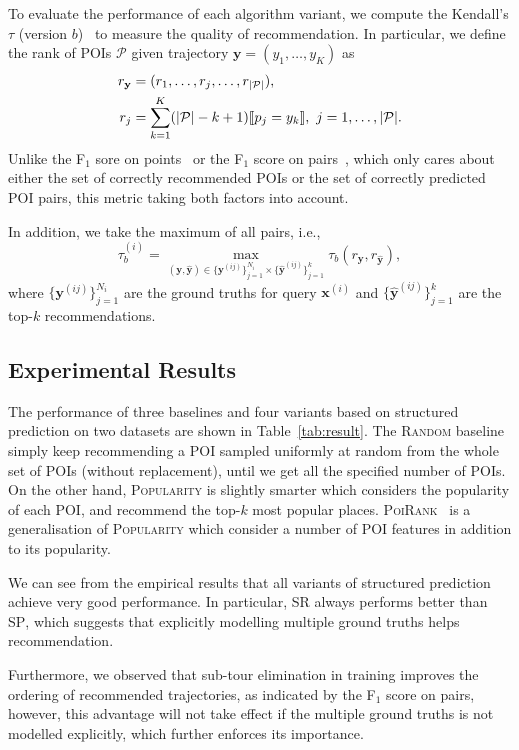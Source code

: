 To evaluate the performance of each algorithm variant, 
we compute the Kendall's $\tau$ (version $b$)~\cite{kendall1945,agresti2010analysis} to measure the quality of recommendation.
In particular,
we define the rank of POIs $\mathcal{P}$ given trajectory $\mathbf{y} = (y_1,\dots,y_K)$ as
\begin{align*} 
r_\mathbf{y} &= (r_1,\dots,r_j,\dots,r_{|\mathcal{P}|}), \\
r_j &= \sum_{k=1}^K (| \mathcal{P} | - k + 1)  \llbracket p_j = y_k \rrbracket, ~ j = 1, \dots, | \mathcal{P} |.
\end{align*}
Unlike the F$_1$ sore on points~\cite{ijcai15} or the F$_1$ score on pairs~\cite{cikm16paper}, 
which only cares about either the set of correctly recommended POIs or the set of correctly predicted POI pairs,
this metric taking both factors into account.

In addition, we take the maximum of all pairs,
i.e.,
\begin{equation*}
\tau_b^{(i)} = 
\max_{(\mathbf{y}, \hat{\mathbf{y}}) \in \{\mathbf{y}^{(ij)}\}_{j=1}^{N_i} \times \{\hat{\mathbf{y}}^{(ij)}\}_{j=1}^k} 
\tau_b(r_\mathbf{y}, r_{\hat{\mathbf{y}}}),
\end{equation*}
where $\{\mathbf{y}^{(ij)}\}_{j=1}^{N_i}$ are the ground truths for query $\mathbf{x}^{(i)}$ and
$\{\hat{\mathbf{y}}^{(ij)}\}_{j=1}^k$ are the top-$k$ recommendations.



\subsection{Experimental Results}
\label{sec:result}



The performance of three baselines and four variants based on structured prediction on two datasets are shown in Table~\ref{tab:result}.
The \textsc{Random} baseline simply keep recommending a POI sampled uniformly at random from the whole set of POIs (without replacement),
until we get all the specified number of POIs.
On the other hand, \textsc{Popularity} is slightly smarter which considers the popularity of each POI, 
and recommend the top-$k$ most popular places.
\textsc{PoiRank}~\cite{cikm16paper} is a generalisation of \textsc{Popularity} which consider a number of POI features in addition to its popularity.

We can see from the empirical results that all variants of structured prediction achieve very good performance.
In particular, \textsc{SR} always performs better than \textsc{SP}, 
which suggests that explicitly modelling multiple ground truths helps recommendation.

Furthermore, we observed that sub-tour elimination in training improves the ordering of recommended trajectories, 
as indicated by the F$_1$ score on pairs, 
however, this advantage will not take effect if the multiple ground truths is not modelled explicitly,
which further enforces its importance.
